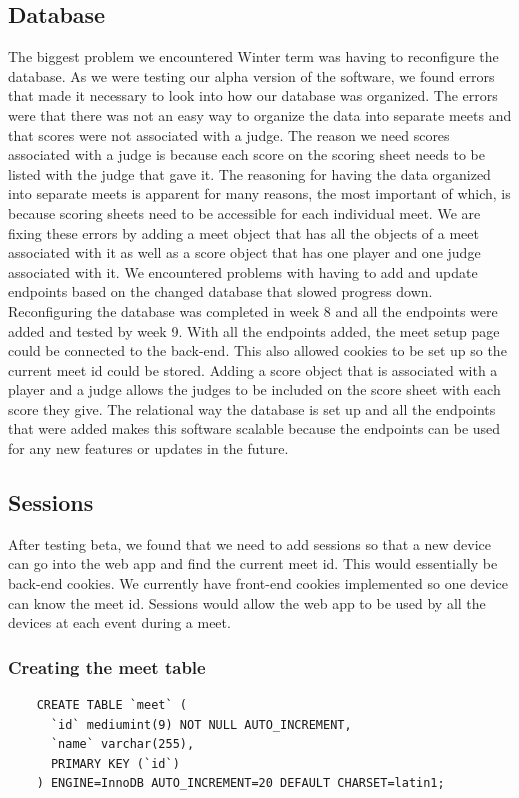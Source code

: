 \documentclass[letterpaper,10pt,draftclsnofoot,onecolumn,]{article}
\begin{document}
\subsection{Database}
The biggest problem we encountered Winter term was having to reconfigure the database. As we were testing our alpha version of the software, we found errors that made it necessary to look into how our database was organized. The errors were that there was not an easy way to organize the data into separate meets and that scores were not associated with a judge. The reason we need scores associated with a judge is because each score on the scoring sheet needs to be listed with the judge that gave it. The reasoning for having the data organized into separate meets is apparent for many reasons, the most important of which, is because scoring sheets need to be accessible for each individual meet. We are fixing these errors by adding a meet object that has all the objects of a meet associated with it as well as a score object that has one player and one judge associated with it. We encountered problems with having to add and update endpoints based on the changed database that slowed progress down. \\
\tab Reconfiguring the database was completed in week 8 and all the endpoints were added and tested by week 9. With all the endpoints added, the meet setup page could be connected to the back-end. This also allowed cookies to be set up so the current meet id could be stored. Adding a score object that is associated with a player and a judge allows the judges to be included on the score sheet with each score they give. The relational way the database is set up and all the endpoints that were added makes this software scalable because the endpoints can be used for any new features or updates in the future. 

\subsection{Sessions}
After testing beta, we found that we need to add sessions so that a new device can go into the web app and find the current meet id. This would essentially be back-end cookies. We currently have front-end cookies implemented so one device can know the meet id. Sessions would allow the web app to be used by all the devices at each event during a meet.

\subsubsection{Creating the meet table}
\begin{verbatim}
    CREATE TABLE `meet` (
      `id` mediumint(9) NOT NULL AUTO_INCREMENT,
      `name` varchar(255),
      PRIMARY KEY (`id`)
    ) ENGINE=InnoDB AUTO_INCREMENT=20 DEFAULT CHARSET=latin1;
\end{verbatim}
\end{document}
